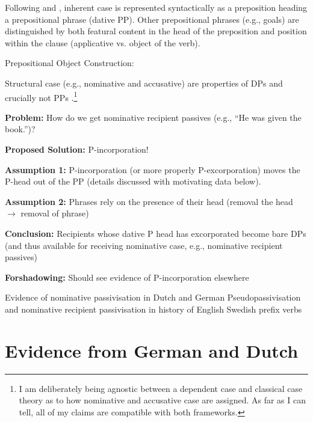 \documentclass[11pt]{article}
\begin{document}
Following \cite{Bayer.2001} and \cite{Asbury.2005,Asbury.2007}, inherent case is represented syntactically as a preposition heading a prepositional phrase (dative PP). Other prepositional phrases (e.g., goals) are distinguished by both featural content in the head of the preposition and position within the clause (applicative vs. object of the verb).

\begin{exe}
	\ex Prepositional Object Construction:\label{ex:POC} \\
\end{exe}

Structural case (e.g., nominative and accusative) are properties of DPs and crucially not PPs \citep{Bayer.2001}.\footnote{I am deliberately being agnostic between a dependent case and classical case theory as to how nominative and accusative case are assigned. As far as I can tell, all of my claims are compatible with both frameworks.} 

\textbf{Problem:} How do we get nominative recipient passives (e.g., ``He was given the book.'')?

\textbf{Proposed Solution:} P-incorporation! \citep{Alexiadou.2014}

\textbf{Assumption 1:} P-incorporation (or more properly P-excorporation) moves the P-head out of the PP (details discussed with motivating data below).

\textbf{Assumption 2:} Phrases rely on the presence of their head (removal the head $\rightarrow$ removal of phrase)

\textbf{Conclusion:} Recipients whose dative P head has excorporated become bare DPs (and thus available for receiving nominative case, e.g., nominative recipient passives)

\begin{exe}
	\ex \textbf{Forshadowing:} Should see evidence of P-incorporation elsewhere
	\begin{xlist}
		\ex Evidence of nominative passivisation in Dutch and German
		\ex Pseudopassivisation and nominative recipient passivisation in history of English
		\ex Swedish prefix verbs
	\end{xlist}
\end{exe}
\section{Evidence from German and Dutch}
\end{document}
